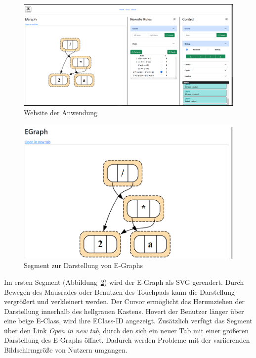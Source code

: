 \newpage
\begin{figure}[H]
\centering
\includegraphics[scale=0.42, angle=90]{../fig/website.png}
\caption{Website der Anwendung}
\label{fig:website}
\end{figure}
\newpage

\begin{figure}[H]
    \centering
    \includegraphics[scale=0.5]{../fig/egraphcontrol.png}
    \caption{Segment zur Darstellung von E-Graphs}
    \label{fig:segment1}
\end{figure}

Im ersten Segment (Abbildung~\ref{fig:segment1}) wird der E-Graph als SVG gerendert. Durch Bewegen des Mausrades oder Benutzen des Touchpads kann die Darstellung vergrößert und verkleinert werden.
Der Cursor ermöglicht das Herumziehen der Darstellung innerhalb des hellgrauen Kastens. Hovert der Benutzer länger über eine beige E-Class, wird ihre EClass-ID angezeigt.
Zusätzlich verfügt das Segment über den Link \textit{Open in new tab}, durch den
sich ein neuer Tab mit einer größeren Darstellung des E-Graphs öffnet. Dadurch werden Probleme mit der variierenden Bildschirmgröße von Nutzern umgangen.

